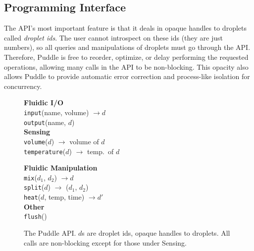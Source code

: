 \documentclass{jpaper}
\begin{document}
\subsection{Programming Interface}
\label{sec:api}

The API's most important feature is that it deals in opaque handles to droplets called \emph{droplet ids}.
The user cannot introspect on these ids (they are just numbers), so all queries and manipulations of droplets must go through the API.
Therefore, Puddle is free to reorder, optimize, or delay performing the requested operations, allowing many calls in the API to be non-blocking.
This opacity also allows Puddle to provide automatic error correction and process-like isolation for concurrency.

\begin{figure}
  \begin{minipage}[t]{.55\linewidth}
    {\bf Fluidic I/O} \\
    \lstinline{input}(name, volume) $\to d$ \\
    \lstinline{output}(name, $d$) \\

    {\bf Sensing} \\
    \lstinline{volume}($d$) $\to$ volume of $d$ \\
    \lstinline{temperature}($d$) $\to$ temp.\ of $d$
  \end{minipage}
  \begin{minipage}[t]{.42\linewidth}
    {\bf Fluidic Manipulation} \\
    \lstinline{mix}($d_1$, $d_2$) $\to d$ \\
    \lstinline{split}($d$) $\to$ ($d_1$, $d_2$) \\
    \lstinline{heat}($d$, temp, time) $\to d'$ \\

    {\bf Other} \\
    \lstinline{flush}()
  \end{minipage}
  \caption{
    The Puddle API.
    $d$s are droplet ids, opaque handles to droplets.
    All calls are non-blocking except for those under Sensing.
  }
  \label{fig:api}
\end{figure}
\end{document}
